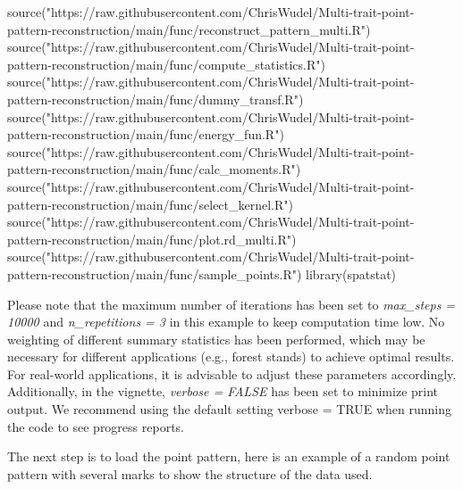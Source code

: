 \documentclass[
  letterpaper,
  DIV=11,
  numbers=noendperiod]{scrreprt}
\newenvironment{Shaded}{\begin{snugshade}}{\end{snugshade}}
\newcommand{\FunctionTok}[1]{\textcolor[rgb]{0.28,0.35,0.67}{#1}}
\newcommand{\NormalTok}[1]{\textcolor[rgb]{0.00,0.23,0.31}{#1}}
\newcommand{\StringTok}[1]{\textcolor[rgb]{0.13,0.47,0.30}{#1}}
\begin{document}
\begin{Shaded}
\begin{Highlighting}[]
\FunctionTok{source}\NormalTok{(}\StringTok{"https://raw.githubusercontent.com/ChrisWudel/Multi{-}trait{-}point{-}pattern{-}reconstruction/main/func/reconstruct\_pattern\_multi.R"}\NormalTok{)}
\FunctionTok{source}\NormalTok{(}\StringTok{"https://raw.githubusercontent.com/ChrisWudel/Multi{-}trait{-}point{-}pattern{-}reconstruction/main/func/compute\_statistics.R"}\NormalTok{)}
\FunctionTok{source}\NormalTok{(}\StringTok{"https://raw.githubusercontent.com/ChrisWudel/Multi{-}trait{-}point{-}pattern{-}reconstruction/main/func/dummy\_transf.R"}\NormalTok{)}
\FunctionTok{source}\NormalTok{(}\StringTok{"https://raw.githubusercontent.com/ChrisWudel/Multi{-}trait{-}point{-}pattern{-}reconstruction/main/func/energy\_fun.R"}\NormalTok{)}
\FunctionTok{source}\NormalTok{(}\StringTok{"https://raw.githubusercontent.com/ChrisWudel/Multi{-}trait{-}point{-}pattern{-}reconstruction/main/func/calc\_moments.R"}\NormalTok{)}
\FunctionTok{source}\NormalTok{(}\StringTok{"https://raw.githubusercontent.com/ChrisWudel/Multi{-}trait{-}point{-}pattern{-}reconstruction/main/func/select\_kernel.R"}\NormalTok{)}
\FunctionTok{source}\NormalTok{(}\StringTok{"https://raw.githubusercontent.com/ChrisWudel/Multi{-}trait{-}point{-}pattern{-}reconstruction/main/func/plot.rd\_multi.R"}\NormalTok{)}
\FunctionTok{source}\NormalTok{(}\StringTok{"https://raw.githubusercontent.com/ChrisWudel/Multi{-}trait{-}point{-}pattern{-}reconstruction/main/func/sample\_points.R"}\NormalTok{)}
\FunctionTok{library}\NormalTok{(spatstat)}
\end{Highlighting}
\end{Shaded}

Please note that the maximum number of iterations has been set to
\emph{max\_steps = 10000} and \emph{n\_repetitions = 3} in this example
to keep computation time low. No weighting of different summary
statistics has been performed, which may be necessary for different
applications (e.g., forest stands) to achieve optimal results. For
real-world applications, it is advisable to adjust these parameters
accordingly. Additionally, in the vignette, \emph{verbose = FALSE} has
been set to minimize print output. We recommend using the default
setting verbose = TRUE when running the code to see progress reports.

The next step is to load the point pattern, here is an example of a
random point pattern with several marks to show the structure of the
data used.
\end{document}
